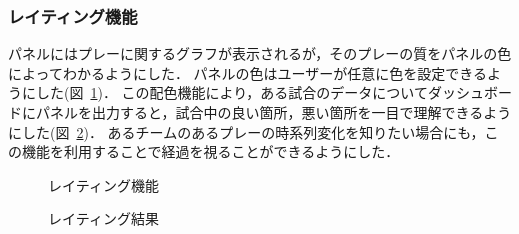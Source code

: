 \documentclass[sotsuron]{kuee}
\begin{document}
			\subsubsection{レイティング機能}
				パネルにはプレーに関するグラフが表示されるが，そのプレーの質をパネルの色によってわかるようにした．
				パネルの色はユーザーが任意に色を設定できるようにした(図~\ref{fig:rate_config})．
				この配色機能により，ある試合のデータについてダッシュボードにパネルを出力すると，試合中の良い箇所，悪い箇所を一目で理解できるようにした(図~\ref{fig:rated})．
				あるチームのあるプレーの時系列変化を知りたい場合にも，この機能を利用することで経過を視ることができるようにした．
					\begin{figure}
						\begin{center}
						\end{center}
						\caption{レイティング機能}
				  		\label{fig:rate_config}
					\end{figure}
					\begin{figure}
						\begin{center}
						\end{center}
						\caption{レイティング結果}
				  		\label{fig:rated}
					\end{figure}					
\end{document}
